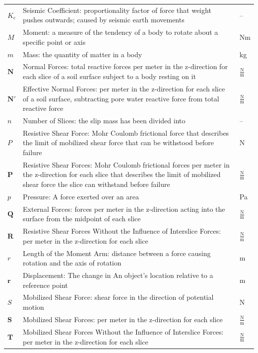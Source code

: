 \documentclass[12pt]{article}
\begin{document}
\begin{longtabu}{l X[l] l}
\\
${K_{\text{c}}}$ & Seismic Coefficient: proportionality factor of force that weight pushes outwards; caused by seismic earth movements & --
\\
$M$ & Moment: a measure of the tendency of a body to rotate about a specific point or axis & Nm
\\
$m$ & Mass: the quantity of matter in a body & kg
\\
$\mathbf{N}$ & Normal Forces: total reactive forces per meter in the z-direction for each slice of a soil surface subject to a body resting on it & $\frac{\text{N}}{\text{m}}$
\\
$\mathbf{N'}$ & Effective Normal Forces: per meter in the z-direction for each slice of a soil surface, subtracting pore water reactive force from total reactive force & $\frac{\text{N}}{\text{m}}$
\\
$n$ & Number of Slices: the slip mass has been divided into & --
\\
$P$ & Resistive Shear Force: Mohr Coulomb frictional force that describes the limit of mobilized shear force that can be withstood before failure & N
\\
$\mathbf{P}$ & Resistive Shear Forces: Mohr Coulomb frictional forces per meter in the z-direction for each slice that describes the limit of mobilized shear force the slice can withstand before failure & $\frac{\text{N}}{\text{m}}$
\\
$p$ & Pressure: A force exerted over an area & Pa
\\
$\mathbf{Q}$ & External Forces: forces per meter in the z-direction acting into the surface from the midpoint of each slice & $\frac{\text{N}}{\text{m}}$
\\
$\mathbf{R}$ & Resistive Shear Forces Without the Influence of Interslice Forces: per meter in the z-direction for each slice & $\frac{\text{N}}{\text{m}}$
\\
$r$ & Length of the Moment Arm: distance between a force causing rotation and the axis of rotation & m
\\
$\mathbf{r}$ & Displacement: The change in An object's location relative to a reference point & m
\\
$S$ & Mobilized Shear Force: shear force in the direction of potential motion & N
\\
$\mathbf{S}$ & Mobilized Shear Forces: per meter in the z-direction for each slice & $\frac{\text{N}}{\text{m}}$
\\
$\mathbf{T}$ & Mobilized Shear Forces Without the Influence of Interslice Forces: per meter in the z-direction for each slice & $\frac{\text{N}}{\text{m}}$

\end{longtabu}
\end{document}
